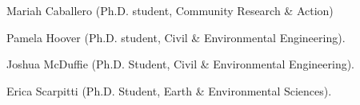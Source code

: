 \item Mariah Caballero (Ph.D. student, Community Research \& Action)
\item Pamela Hoover (Ph.D. student, Civil \& Environmental Engineering).
\item Joshua McDuffie (Ph.D. Student, Civil \& Environmental Engineering).
\item Erica Scarpitti (Ph.D. Student, Earth \& Environmental Sciences).
